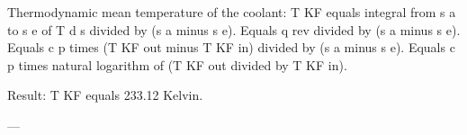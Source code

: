 Thermodynamic mean temperature of the coolant:  
T KF equals integral from s a to s e of T d s divided by (s a minus s e).  
Equals q rev divided by (s a minus s e).  
Equals c p times (T KF out minus T KF in) divided by (s a minus s e).  
Equals c p times natural logarithm of (T KF out divided by T KF in).  

Result: T KF equals 233.12 Kelvin.  

---
